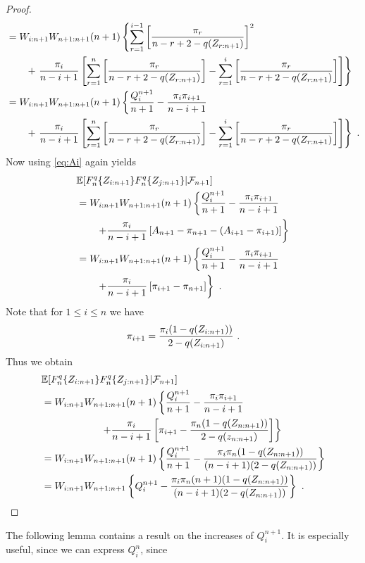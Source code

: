 \begin{proof}
\begin{align*}
	&= W_{i:n+1}W_{n+1:n+1}(n+1) \left\{\sum\limits_{r=1}^{i-1}\left[\frac{\pi_r}{n-r+2-q(Z_{r:n+1})} \right]^2\right.\\
	& \qquad + \left. \frac{\pi_i}{n-i+1}\left[\sum\limits_{r=1}^{n} \left[\frac{\pi_r}{n-r+2-q(Z_{r:n+1})}\right] - \sum\limits_{r=1}^{i} \left[\frac{\pi_r}{n-r+2-q(Z_{r:n+1})}\right]\right]\right\}\\
	&= W_{i:n+1}W_{n+1:n+1}(n+1) \left\{\frac{Q_i^{n+1}}{n+1} - \frac{\pi_i\pi_{i+1}}{n-i+1}\right.\\
	& \qquad + \left. \frac{\pi_i}{n-i+1}\left[\sum\limits_{r=1}^{n} \left[\frac{\pi_r}{n-r+2-q(Z_{r:n+1})}\right] - \sum\limits_{r=1}^{i}  \left[\frac{\pi_r}{n-r+2-q(Z_{r:n+1})}\right]\right]\right\}\textrm{ .}
\end{align*}
%
Now using \eqref{eq:Ai} again yields
\begin{align*}
	&  \mathbb{E}[F_n^q\{Z_{i:n+1}\}F_n^q\{Z_{j:n+1}\}|\mathcal{F}_{n+1}]\\
	&= W_{i:n+1}W_{n+1:n+1}(n+1) \left\{\frac{Q_i^{n+1}}{n+1} - \frac{\pi_i\pi_{i+1}}{n-i+1}\right.\\
	& \qquad \left. + \frac{\pi_i}{n-i+1}\left[A_{n+1} - \pi_{n+1} - (A_{i+1}-\pi_{i+1}) \right] \right\}\\
	&= W_{i:n+1}W_{n+1:n+1}(n+1) \left\{\frac{Q_i^{n+1}}{n+1} - \frac{\pi_i\pi_{i+1}}{n-i+1}\right.\\
	& \qquad \left. + \frac{\pi_i}{n-i+1}\left[  \pi_{i+1} - \pi_{n+1} \right] \right\}\textrm{ .}
\end{align*}
Note that for $1\leq i\leq n$ we have
$$\pi_{i+1} = \frac{\pi_i (1-q(Z_{i:n+1}))}{2-q(Z_{i:n+1})}\textrm{ .}$$
Thus we obtain
\begin{align*}
	&  \mathbb{E}[F_n^q\{Z_{i:n+1}\}F_n^q\{Z_{j:n+1}\}|\mathcal{F}_{n+1}]\\
	&= W_{i:n+1}W_{n+1:n+1}(n+1) \left\{\frac{Q_i^{n+1}}{n+1} - \frac{\pi_i\pi_{i+1}}{n-i+1}\right.\\
	& \qquad\qquad\qquad \left. + \frac{\pi_i}{n-i+1}\left[\pi_{i+1} - \frac{\pi_n(1-q(Z_{n:n+1}))}{2-q(z_{n:n+1})}   \right] \right\}\\
	&= W_{i:n+1}W_{n+1:n+1}(n+1) \left\{\frac{Q_i^{n+1}}{n+1} - \frac{\pi_i\pi_n(1-q(Z_{n:n+1}))}{(n-i+1)(2-q(Z_{n:n+1}))} \right\}\\
	&= W_{i:n+1}W_{n+1:n+1} \left\{Q_i^{n+1} - \frac{\pi_i\pi_n(n+1)(1-q(Z_{n:n+1}))}{(n-i+1)(2-q(Z_{n:n+1}))} \right\}\textrm{ .}
\end{align*}
\end{proof}
%
The following lemma contains a result on the increases of $Q_i^{n+1}$. It is especially useful, since we can express $Q_i^{n}$, since 
